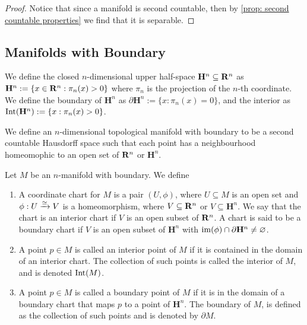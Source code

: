 \begin{proof}
  Notice that since a manifold is second countable, then by \cref{prop: second
  countable properties} we find that it is separable.
\end{proof}

\subsection{Manifolds with Boundary}

\begin{definition}
  We define the closed \(n\)-dimensional upper half-space \(\mathbf{H}^n
  \subseteq \mathbf{R}^n\) as \(\mathbf{H}^n := \{x \in \mathbf{R}^n : \pi_n(x) >
  0\}\) where \(\pi_n\) is the projection of the \(n\)-th coordinate. We define
  the boundary of \(\mathbf{H}^n\) as \(\partial \mathbf{H}^n := \{x : \pi_n(x) =
  0\}\), and the interior as \(\operatorname{Int}(\mathbf{H}^n) := \{x : \pi_n(x) > 0\}\).
\end{definition}

\begin{definition}
  \label{def: manifold with boundary}
  We define an \(n\)-dimensional topological manifold with boundary to be a
  second countable Hausdorff space such that each point has a neighbourhood
  homeomophic to an open set of \(\mathbf{R}^n\) or \(\mathbf{H}^n\).
\end{definition}

\begin{definition}[Miscelaneous]
  Let \(M\) be an \(n\)-manifold with boundary. We define
  \begin{enumerate}[(MB1)]
    \item A coordinate chart for \(M\) is a pair \((U, \phi)\), where \(U
      \subseteq M\) is an open set and \(\phi: U \xrightarrow{\simeq} V\) is a
      homeomorphism, where \(V \subseteq \mathbf{R}^n\) or \(V \subseteq
      \mathbf{H}^n\). We say that the chart is an interior chart if \(V\) is an
      open subset of \(\mathbf{R}^n\). A chart is said to be a boundary chart
      if \(V\) is an open subset of \(\mathbf{H}^n\) with \(\operatorname{im}(\phi) \cap
      \partial \mathbf{H}^n \neq \varnothing\).
    \item A point \(p \in M\) is called an interior point of \(M\) if it is
      contained in the domain of an interior chart. The collection of such
      points is called the interior of \(M\), and is denoted \(\operatorname{Int}(M)\).
    \item A point \(p \in M\) is called a boundary point of \(M\) if it is in
      the domain of a boundary chart that maps \(p\) to a point of
      \(\mathbf{H}^n\). The boundary of \(M\), is defined as the collection of
      such points and is denoted by \(\partial M\).
  \end{enumerate}
\end{definition}

